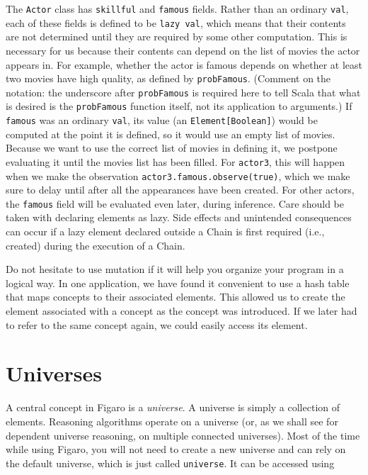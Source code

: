 The \texttt{Actor} class has \texttt{skillful} and \texttt{famous} fields. Rather than an ordinary \texttt{val}, each of these fields is defined to be \texttt{lazy val}, which means that their contents are not determined until they are required by some other computation. This is necessary for us because their contents can depend on the list of movies the actor appears in. For example, whether the actor is famous depends on whether at least two movies have high quality, as defined by \texttt{probFamous}. (Comment on the notation: the underscore after \texttt{probFamous} is required here to tell Scala that what is desired is the \texttt{probFamous} function itself, not its application to arguments.)   If \texttt{famous} was an ordinary \texttt{val}, its value (an \texttt{Element[Boolean]}) would be computed at the point it is defined, so it would use an empty list of movies. Because we want to use the correct list of movies in defining it, we postpone evaluating it until the movies list has been filled. For \texttt{actor3}, this will happen when we make the observation \texttt{actor3.famous.observe(true)}, which we make sure to delay until after all the appearances have been created. For other actors, the \texttt{famous} field will be evaluated even later, during inference. Care should be taken with declaring elements as lazy. Side effects and unintended consequences can occur if a lazy element declared outside a Chain is first required (i.e., created) during the execution of a Chain.

Do not hesitate to use mutation if it will help you organize your program in a logical way. In one application, we have found it convenient to use a hash table that maps concepts to their associated elements. This allowed us to create the element associated with a concept as the concept was introduced. If we later had to refer to the same concept again, we could easily access its element.

\section{Universes}

A central concept in Figaro is a \emph{universe}. A universe is simply a collection of elements. Reasoning algorithms operate on a universe (or, as we shall see for dependent universe reasoning, on multiple connected universes). Most of the time while using Figaro, you will not need to create a new universe and can rely on the default universe, which is just called \texttt{universe}. It can be accessed using


